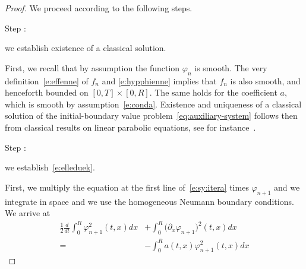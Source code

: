 \documentclass[11pt,leqno]{amsart}
\newcounter{stepnb}
\numberwithin{equation}{section}
\begin{document}
\begin{proof}
We proceed according to the following steps. \\
{\setcounter{stepnb}{0}}
{{{\sc \addtocounter{stepnb}{1}\noindent  Step :} {we establish existence of a classical solution}.}} First, we recall that by assumption the function $\varphi_n$ is smooth.  The very definition~\eqref{e:effenne} of $f_n$ and \eqref{e:hypphienne} implies that $f_n$ is also smooth, and henceforth bounded on $[0, T] \times [0, R]$. The same holds for the coefficient $a$, which is smooth by assumption~\eqref{e:conda}.
Existence and uniqueness of a classical solution of the initial-boundary value problem~\eqref{eq:auxiliary-system} follows then from classical results on linear parabolic equations, see for instance~\cite[\S 7.1]{Evans}. \\
{{{\sc \addtocounter{stepnb}{1}\noindent  Step :} {we establish~\eqref{e:elleduek}}.}}
First, we multiply the equation at the first line of~\eqref{e:sy:itera}
times $\varphi_{n+1}$ 
and we integrate in space and we use the homogeneous
Neumann boundary conditions. We arrive at 
\begin{equation}
\label{e:moltiplico}
\begin{split}
    \frac{1}{2} \frac{d}{dt} \int_0^R \varphi_{n+1}^2 (t, x) dx & +
    \int_0^R \big( \partial_x \varphi_{n+1} \big)^2 (t, x) dx \\=& -
     \int_0^R a (t, x) \varphi_{n+1}^2   (t, x) dx 
     

\end{split}
\end{equation}
\end{proof}
\end{document}
